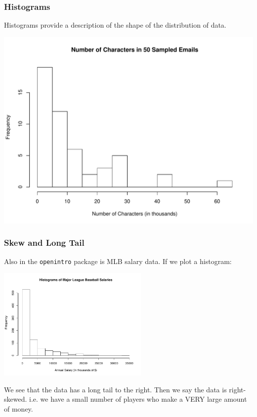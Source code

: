 \documentclass[handout]{beamer}
\newcommand{\blue}[1]{\textcolor{blue2}{#1}}
\begin{document}
\begin{frame}[fragile]
\frametitle{Histograms}

Histograms provide a description of the shape of the \blue{distribution} of data.  

\begin{center}
\includegraphics[height=0.7\textheight]{figure/hist.pdf}
\end{center}

\end{frame}



\begin{frame}[fragile]
\frametitle{Skew and Long Tail}
Also in the {\tt openintro} package is MLB salary data.  If we plot a histogram:

\begin{center}
\includegraphics[height=5.5cm]{figure/MLB.pdf}
\end{center}

\pause We see that the data has a \blue{long tail} to the right.  Then we say the data is \blue{right-skewed}.  i.e. we have a small number of players who make a VERY large amount of money.  

\end{frame}
\end{document}
